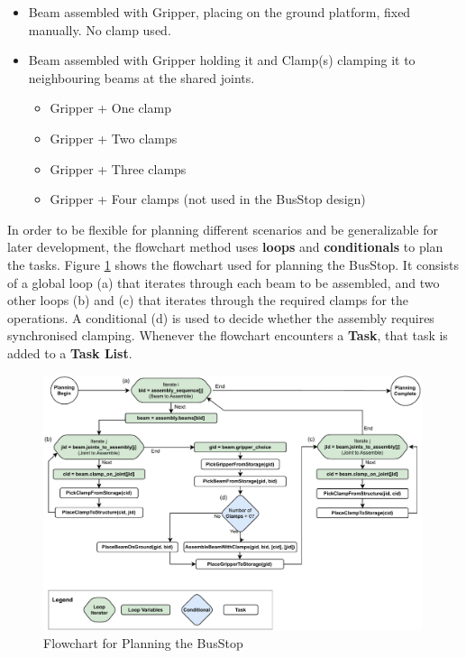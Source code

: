 \begin{itemize}
	\item Beam assembled with Gripper, placing on the ground platform, fixed manually. No clamp used.

	\item Beam assembled with Gripper holding it and Clamp(s) clamping it to neighbouring beams at the shared joints.

	\begin{itemize}
		\item Gripper + One clamp

		\item Gripper + Two clamps

		\item Gripper + Three clamps

		\item Gripper + Four clamps (not used in the BusStop design)

	\end{itemize}
\end{itemize}
In order to be flexible for planning different scenarios and be generalizable for later development, the flowchart method uses \textbf{loops }and \textbf{conditionals }to plan the tasks. Figure \ref{fig:flowchart-for-planning-busstop} shows the flowchart used for planning the BusStop. It consists of a global loop (a) that iterates through each beam to be assembled, and two other loops (b) and (c) that iterates through the required clamps for the operations. A conditional (d) is used to decide whether the assembly requires synchronised clamping. Whenever the flowchart encounters a \textbf{Task}, that task is added to a \textbf{Task List}.

\begin{figure}[!h]
    \centering
    \includegraphics[width=0.99\textwidth]{images/6a/flowchart-1.pdf}
    \caption{Flowchart for Planning the BusStop}
    \label{fig:flowchart-for-planning-busstop}
\end{figure}


